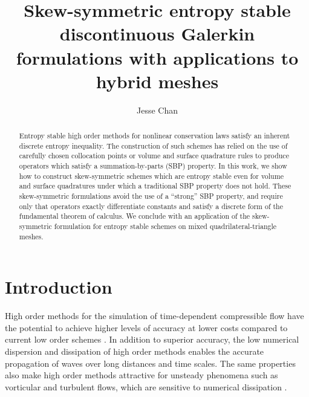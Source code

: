 \documentclass{svjour3}                     %
\date{}
\author{Jesse Chan}
\title{Skew-symmetric entropy stable discontinuous Galerkin formulations with applications to hybrid meshes}
\begin{document}


\maketitle

\begin{abstract}
Entropy stable high order methods for nonlinear conservation laws satisfy an inherent discrete entropy inequality.  The construction of such schemes has relied on the use of carefully chosen collocation points \cite{gassner2013skew, fisher2013high, carpenter2014entropy, crean2018entropy, chan2018efficient} or volume and surface quadrature rules \cite{chan2017discretely, chan2018discretely} to produce operators which satisfy a summation-by-parts (SBP) property.  In this work, we show how to construct skew-symmetric schemes which are entropy stable even for volume and surface quadratures under which a traditional SBP property does not hold.  These skew-symmetric formulations avoid the use of a ``strong'' SBP property, and require only that operators exactly differentiate constants and satisfy a discrete form of the fundamental theorem of calculus.   We conclude with an application of the skew-symmetric formulation for entropy stable schemes on mixed quadrilateral-triangle meshes. 
\end{abstract}

\tableofcontents

\section{Introduction}

High order methods for the simulation of time-dependent compressible flow have the potential to achieve higher levels of accuracy at lower costs compared to current low order schemes \cite{wang2013high}.  In addition to superior accuracy, the low numerical dispersion and dissipation of high order methods \cite{ainsworth2004dispersive} enables the accurate propagation of waves over long distances and time scales.  The same properties also make high order methods attractive for unsteady phenomena such as vorticular and turbulent flows, which are sensitive to numerical dissipation \cite{visbal1999high, wang2013high}.  
\end{document}
